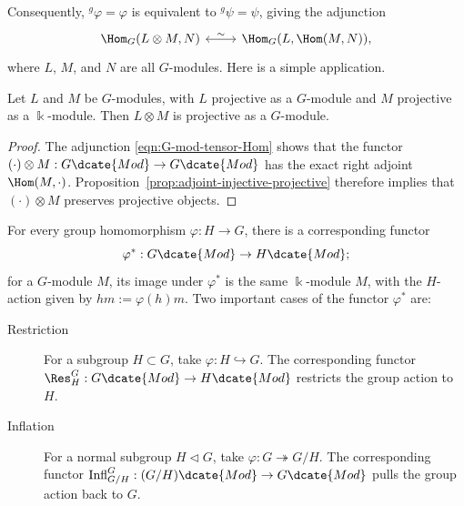 Consequently, ${}^g\varphi=\varphi$ is equivalent to ${}^g\psi=\psi$, giving
the adjunction
\begin{equation}\label{eqn:G-mod-tensor-Hom}
	\begin{tikzcd}
		\Hom_G(L \otimes M, N) \arrow[leftrightarrow, r, "\sim"] & \Hom_G(L, \Hom(M, N)),
	\end{tikzcd}
\end{equation}
where $L$, $M$, and $N$ are all $G$-modules. Here is a simple application.

\begin{proposition}\label{prop:group-tensor-proj}
	Let $L$ and $M$ be $G$-modules, with $L$ projective as a $G$-module and
	$M$ projective as a $\Bbbk$-module. Then $L\otimes M$ is projective as a
	$G$-module.
\end{proposition}

\begin{proof}
	The adjunction \eqref{eqn:G-mod-tensor-Hom} shows that the functor
	$(\cdot)\otimes M:G\dcate{Mod}\to G\dcate{Mod}$ has the exact right
	adjoint $\Hom(M,\cdot)$. Proposition~\ref{prop:adjoint-injective-projective}
	therefore implies that $(\cdot)\otimes M$ preserves projective objects.
\end{proof}

\begin{definition}\label{def:Res-Infl}
	For every group homomorphism $\varphi:H\to G$, there is a corresponding
	functor
	\[ \varphi^*: G\dcate{Mod} \to H\dcate{Mod}; \]
	for a $G$-module $M$, its image under $\varphi^*$ is the same
	$\Bbbk$-module $M$, with the $H$-action given by $hm:=\varphi(h)m$. Two
	important cases of the functor $\varphi^*$ are:
	\begin{description}
		\item[Restriction] For a subgroup $H\subset G$, take
		$\varphi:H\hookrightarrow G$. The corresponding functor
		$\Res^G_H:G\dcate{Mod}\to H\dcate{Mod}$ restricts the group action to
		$H$.
		\item[Inflation] For a normal subgroup $H\lhd G$, take
		$\varphi:G\twoheadrightarrow G/H$. The corresponding functor
		$\mathrm{Infl}^G_{G/H}:(G/H)\dcate{Mod}\to G\dcate{Mod}$ pulls the
		group action back to $G$.
	\end{description}
\end{definition}

